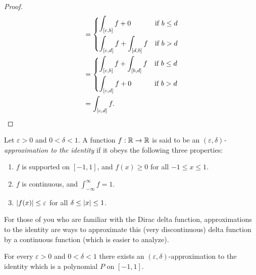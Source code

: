 \begin{proof}
\begin{align*}
                            & = \begin{dcases}
                                  \int_{[c, b]} f + 0               & \text{if } b \leq d \\
                                  \int_{[c, d]} f + \int_{[d, b]} f & \text{if } b > d
                                \end{dcases}                     \\
                            & = \begin{dcases}
                                  \int_{[c, b]} f + \int_{[b, d]} f & \text{if } b \leq d \\
                                  \int_{[c, d]} f + 0               & \text{if } b > d
                                \end{dcases}                     \\
                            & = \int_{[c, d]} f.
  \end{align*}
\end{proof}

\begin{defn}\label{ii:3.8.6}
  Let \(\varepsilon > 0\) and \(0 < \delta < 1\).
  A function \(f : \mathbb{R} \to \mathbb{R}\) is said to be an \emph{\((\varepsilon, \delta)\)-approximation to the identity} if it obeys the following three properties:
  \begin{enumerate}
    \item \(f\) is supported on \([-1, 1]\), and \(f(x) \geq 0\) for all \(-1 \leq x \leq 1\).
    \item \(f\) is continuous, and \(\int_{-\infty}^\infty f = 1\).
    \item \(\left\lvert f(x)\right\rvert \leq \varepsilon\) for all \(\delta \leq \left\lvert x\right\rvert \leq 1\).
  \end{enumerate}
\end{defn}

\begin{rmk}\label{ii:3.8.7}
  For those of you who are familiar with the Dirac delta function, approximations to the identity are ways to approximate this (very discontinuous) delta function by a continuous function (which is easier to analyze).
\end{rmk}

\begin{lem}\label{ii:3.8.8}
  For every \(\varepsilon > 0\) and \(0 < \delta < 1\) there exists an \((\varepsilon, \delta)\)-approximation to the identity which is a polynomial \(P\) on \([-1, 1]\).
\end{lem}

